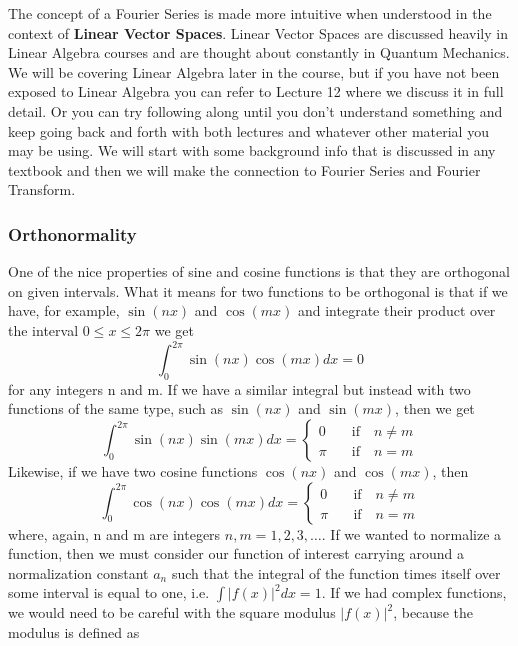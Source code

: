 \documentclass{article}
\newcommand{\be}{\begin{equation}}
\newcommand{\ee}{\end{equation}}
\begin{document}
The concept of a Fourier Series is made more intuitive when understood in the context of \textbf{Linear Vector Spaces}.
Linear Vector Spaces are discussed heavily in Linear Algebra courses and are thought about constantly in Quantum Mechanics.
We will be covering Linear Algebra later in the course, but if you have not been exposed to Linear Algebra you can refer to Lecture 12 where we discuss it in full detail.
Or you can try following along until you don't understand something and keep going back and forth with both lectures and whatever other material you may be using.
We will start with some background info that is discussed in any textbook and then we will make the connection to Fourier Series and Fourier Transform.

\subsubsection*{Orthonormality}
One of the nice properties of sine and cosine functions is that they are orthogonal on given intervals.
What it means for two functions to be orthogonal is that if we have, for example, $\sin(nx)$ and $\cos(mx)$ and integrate their product over the interval $0 \leq x \leq 2 \pi$ we get
\be \label{eq:sin_cos}
  \int_0^{2\pi} \sin(nx)\cos(mx) dx = 0
\ee
for any integers n and m.
If we have a similar integral but instead with two functions of the same type, such as $\sin(nx)$ and $\sin(mx)$, then we get
\be \label{eq:sin_sin_orth}
\int_0^{2\pi} \sin(nx)\sin(mx) dx =
  \left\{
    \begin{array}{ll}
      0 & \quad \text{if} \quad n \neq m \\
      \pi & \quad \text{if} \quad n = m
    \end{array}
  \right.
\ee
Likewise, if we have two cosine functions $\cos(nx)$ and $\cos(mx)$, then
\be \label{eq:cos_cos_orth}
\int_0^{2\pi} \cos(nx)\cos(mx) dx =
  \left\{
    \begin{array}{ll}
      0 & \quad \text{if} \quad n \neq m \\
      \pi & \quad \text{if} \quad n = m
    \end{array}
  \right.
\ee
where, again, n and m are integers $n,m = 1, 2, 3, \hdots$.
If we wanted to normalize a function, then we must consider our function of interest carrying around a normalization constant $a_n$ such that the integral of the function times itself over some interval is equal to one, i.e. $\int |f(x)|^2 dx = 1$.
If we had complex functions, we would need to be careful with the square modulus $|f(x)|^2$, because the modulus is defined as
\end{document}
